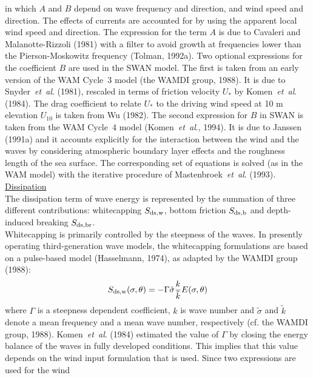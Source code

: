 \documentclass[12pt]{book}
\begin{document}
in which $A$ and $B$ depend on wave frequency and direction, and wind speed and direction. The effects of
currents are accounted for by using the apparent local wind speed and direction. The expression
for the term $A$ is due to Cavaleri and Malanotte-Rizzoli (1981) with a filter to avoid growth at frequencies
lower than the Pierson-Moskowitz frequency (Tolman, 1992a). Two optional expressions for the coefficient
$B$ are used in the SWAN model. The first is taken from an early version of the WAM Cycle~3 model
(the WAMDI group, 1988). It is due to Snyder~{\it et~al}. (1981), rescaled in terms of friction velocity
$U _{*}$ by Komen~{\it et~al}. (1984). The drag coefficient to relate $U _{*}$ to the driving wind speed at 10 m elevation
$U _{10}$ is taken from Wu (1982). The second expression for $B$ in SWAN is taken from the
WAM Cycle~4 model (Komen~{\it et~al}., 1994). It is due to Janssen (1991a) and it accounts
explicitly for the interaction between the wind and the waves by considering atmospheric boundary layer
effects and the roughness length of the sea surface. The corresponding set of equations is solved (as
in the WAM model) with the iterative procedure of Mastenbroek~{\it et~al}. (1993).
\nocite{Phi57,Mil57,Tol92a,Cav81M,WAM88,Sny81DEL,Wu82,Jan91a,Mas93BJ}
\\[2ex]
\noindent
\underline{Dissipation}\\[2ex]
The dissipation term of wave energy is represented by the summation of three different contributions:
whitecapping $S_{\rm ds,w}$, bottom friction $S_{\rm ds,b}$ and depth-induced breaking $S_{\rm ds,br}$.
\\[2ex]
\noindent
Whitecapping is primarily controlled by the steepness of the waves. In presently operating third-generation
wave models, the whitecapping formulations are based on a pulse-based model (Hasselmann, 1974), as adapted by the
WAMDI group (1988):
\begin{equation}
  S_{\rm ds,w} (\sigma,\theta) = -\Gamma \tilde{\sigma} \frac{k}{\tilde{k}} E (\sigma,\theta)
  \label{eq2-4}
\end{equation}
where $\Gamma$ is a steepness dependent coefficient, $k$ is wave number and ${\tilde{\sigma}}$ and ${\tilde{k}}$
denote a mean frequency and a mean wave number, respectively (cf. the WAMDI group, 1988). Komen~{\it et~al}. (1984)
estimated the value of $\Gamma$ by closing the energy balance of the waves in fully developed conditions. This
implies that this value depends on the wind input formulation that is used. Since two expressions are used for the wind
\end{document}
